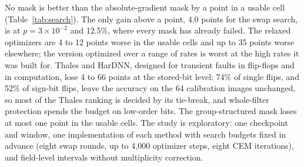 No mask is better than the absolute-gradient mask by a point in a usable cell (Table~\ref{tab:search}). The only gain above a point, 4.0 points for the swap search, is at $p=3\times10^{-2}$ and 12.5\%, where every mask has already failed. The relaxed optimizers are 4 to 12 points worse in the usable cells and up to 35 points worse elsewhere; the version optimized over a range of rates is worst at the high rates it was built for. Thales and HarDNN, designed for transient faults in flip-flops and in computation, lose 4 to 66 points at the stored-bit level: 74\% of single flips, and 52\% of sign-bit flips, leave the accuracy on the 64 calibration images unchanged, so most of the Thales ranking is decided by its tie-break, and whole-filter protection spends the budget on low-order bits. The group-structured mask loses at most one point in the usable cells. The study is exploratory: one checkpoint and window, one implementation of each method with search budgets fixed in advance (eight swap rounds, up to 4,000 optimizer steps, eight CEM iterations), and field-level intervals without multiplicity correction.
